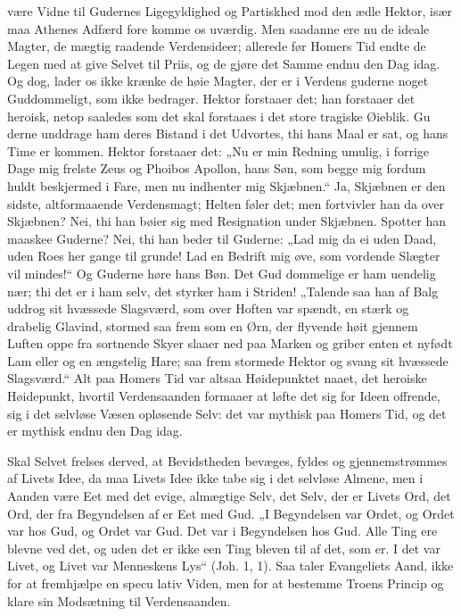 \documentclass[12pt]{book}
\newcommand{\opage}[1]{\marginnote{\footnotesize\textit{[#1]}}}
\begin{document}
være Vidne til Gudernes Ligegyldighed og Partiskhed
mod den ædle Hektor, især maa Athenes Adfærd fore\-%
komme os uværdig. Men saadanne ere nu de ideale
Magter, de mægtig raadende Verdensideer; allerede før
Homers Tid endte de Legen med at give Selvet til Priis,
og de gjøre det Samme endnu den Dag idag. Og dog,
lader os ikke krænke de høie Magter, der er i Verdens\-%
guderne noget Guddommeligt, som ikke bedrager. Hektor
forstaaer det; han forstaaer det heroisk, netop saaledes
som det skal forstaaes i det store tragiske Øieblik. Gu\-%
derne unddrage ham deres Bistand i det Udvortes, thi
hans Maal er sat, og hans Time er kommen. Hektor
forstaaer det: „Nu er min Redning umulig, i forrige
Dage mig frelste Zeus og Phoibos Apollon, hans Søn,
som begge mig fordum huldt beskjermed i Fare, men
nu indhenter mig Skjæbnen.“ Ja, Skjæbnen er den
sidste, altformaaende Verdensmagt; Helten føler det;
men fortvivler han da over Skjæbnen? Nei, thi han bøier
sig med Resignation under Skjæbnen. Spotter han
maaskee Guderne? Nei, thi han beder til Guderne:
„Lad mig da ei uden Daad, uden Roes her gange til\-%
grunde! Lad en Bedrift mig øve, som vordende Slægter
vil mindes!“ Og Guderne høre hans Bøn. Det Gud\-%
\opage{43}\setcounter{footnote}{0}%
dommelige er ham uendelig nær; thi det er i ham selv,
det styrker ham i Striden! „Talende saa han af Balg
uddrog sit hvæssede Slagsværd, som over Hoften var
spændt, en stærk og drabelig Glavind, stormed saa frem
som en Ørn, der flyvende høit gjennem Luften oppe fra
sortnende Skyer slaaer ned paa Marken og griber enten
et nyfødt Lam eller og en ængstelig Hare; saa frem\-%
stormede Hektor og svang sit hvæssede Slagsværd.“
Alt paa Homers Tid var altsaa Høidepunktet naaet, det
heroiske Høidepunkt, hvortil Verdensaanden formaaer at
løfte det sig for Ideen offrende, sig i det selvløse Væsen
opløsende Selv: det var mythisk paa Homers Tid, og
det er mythisk endnu den Dag idag.

Skal Selvet frelses derved, at Bevidstheden bevæges,
fyldes og gjennemstrømmes af Livets Idee, da maa Livets
Idee ikke tabe sig i det selvløse Almene, men i Aanden
være Eet med det evige, almægtige Selv, det Selv, der
er Livets Ord, det Ord, der fra Begyndelsen af er Eet
med Gud. „I Begyndelsen var Ordet, og Ordet var
hos Gud, og Ordet var Gud. Det var i Begyndelsen
hos Gud. Alle Ting ere blevne ved det, og uden det
er ikke een Ting bleven til af det, som er. I det var
Livet, og Livet var Menneskens Lys“ (Joh. 1, 1). Saa
taler Evangeliets Aand, ikke for at fremhjælpe en specu\-%
lativ Viden, men for at bestemme Troens Princip og
klare sin Modsætning til Verdensaanden.
\end{document}
